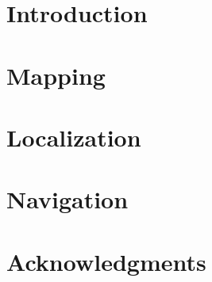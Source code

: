 \documentclass[a4paper,11pt]{article}
\begin{document}


\newpage

\section{Introduction} \label{introduction}


\section{Mapping} \label{mapping}


\section{Localization} \label{localization}


\section{Navigation} \label{navigation}


\newpage
\section*{Acknowledgments} \label{acknowledgments}


\newpage
\printbibliography
\end{document}
